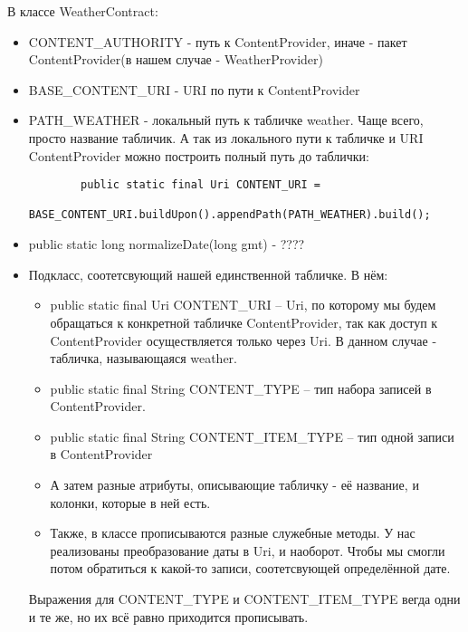 \documentclass[12 pt]{article}
\begin{document}
	В классе WeatherContract:
	\begin{itemize}
	    \item CONTENT\_AUTHORITY - путь к ContentProvider, иначе - пакет ContentProvider(в нашем случае - WeatherProvider)
	    \item BASE\_CONTENT\_URI - URI по пути к ContentProvider
	    \item PATH\_WEATHER - локальный путь к табличке weather. Чаще всего, просто название табличик. А так из локального пути к табличке и URI ContentProvider можно построить полный путь до таблички: 
	    \begin{lstlisting}
	    public static final Uri CONTENT_URI =
                BASE_CONTENT_URI.buildUpon().appendPath(PATH_WEATHER).build();
        \end{lstlisting}
	    \item public static long normalizeDate(long gmt) - ????
	    \item Подкласс, соотетсвующий нашей единственной табличке.
	    В нём:
	    \begin{itemize}
	        \item public static final Uri CONTENT\_URI -- Uri, по которому мы будем обращаться к конкретной табличке ContentProvider, так как доступ к ContentProvider осуществляется только через Uri. В данном случае - табличка, называющаяся weather.
	        \item public static final String CONTENT\_TYPE -- тип набора записей в ContentProvider.
	        \item public static final String CONTENT\_ITEM\_TYPE -- тип одной записи в ContentProvider
	        \item А затем разные атрибуты, описывающие табличку - её название, и колонки, которые в ней есть.
	        \item Также, в классе прописываются разные служебные методы. У нас реализованы преобразование даты в Uri, и наоборот. Чтобы мы смогли потом обратиться к какой-то записи, соотетсвующей определённой дате.
	    \end{itemize}
	    Выражения для CONTENT\_TYPE и CONTENT\_ITEM\_TYPE вегда одни и те же, но их всё равно приходится прописывать.
	\end{itemize}
\end{document}
